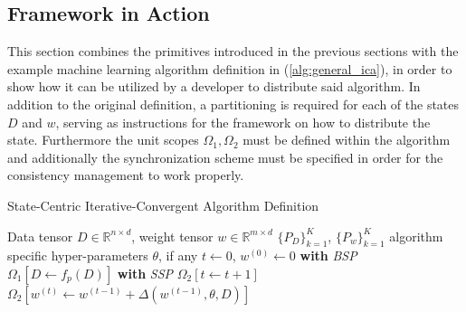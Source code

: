 \subsection{Framework in Action}
This section combines the primitives introduced in the previous sections with the example machine learning algorithm definition in (\ref{alg:general_ica}), in order to show how it can be utilized by a developer to distribute said algorithm.
In addition to the original definition, a partitioning is required for each of the states $D$ and $w$, serving as instructions for the framework on how to distribute the state.
Furthermore the unit scopes $\Omega_1, \Omega_2$ must be defined within the algorithm and additionally the synchronization scheme must be specified in order for the consistency management to work properly.
\begin{algorithm}
\caption{State-Centric Iterative-Convergent Algorithm Definition}\label{alg:scpm_ica}
\begin{algorithmic}[1]{}
\ALGSTATE Data tensor $D \in \mathbb{R}^{n \times d}$, weight tensor $w \in \mathbb{R}^{m \times d}$
\PARTITIONING $\{P_D\}_{k=1}^K$, $\{P_w\}_{k=1}^K$
\INPUT algorithm specific hyper-parameters $\theta$, if any
\INIT $t \gets 0$, $w^{(0)} \gets 0$
\State \textbf{with} \textit{BSP}
\State \hspace{\algorithmicindent} $\Omega_1[D \gets f_{p}(D)]$
\Repeat
\State \textbf{with} \textit{SSP}
\State \hspace{\algorithmicindent} $\Omega_2[t \gets t + 1]$
\State \hspace{\algorithmicindent} $\Omega_2[w^{(t)} \gets w^{(t-1)} + \Delta(w^{(t-1)}, \theta, D)]$
\end{algorithmic}
\end{algorithm}


